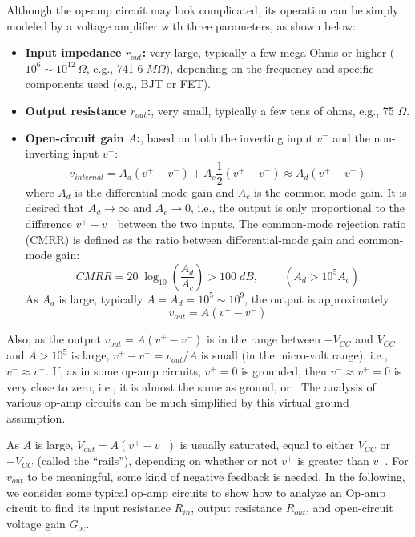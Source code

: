Although the op-amp circuit may look complicated, its operation can be simply 
modeled by a voltage amplifier with three parameters, as shown below:


\begin{itemize}
\item
  {\bf Input impedance $r_{out}$:} very large, typically a few mega-Ohms or
  higher ($10^6\sim 10^{12}\,\Omega$, e.g., 741 $6\;M\Omega$), depending on 
  the frequency and specific components used (e.g., BJT or FET).

\item {\bf Output resistance $r_{out}$:}, very small, typically a few tens of
  ohms, e.g., 75 $\Omega$.

\item {\bf Open-circuit gain $A$:}, based on both the inverting input $v^-$ 
  and the non-inverting input $v^+$:
  \[
  v_{internal}=A_d (v^+ - v^-)+A_c \frac{1}{2}(v^+ + v^-)\approx A_d (v^+ - v^-) 
  \]
  where $A_d$ is the differential-mode gain and $A_c$ is the common-mode gain.
  It is desired that $A_d\rightarrow \infty$ and $A_c\rightarrow 0$, i.e., the 
  output is only proportional to the difference $v^+-v^-$ between the two inputs. 
  The common-mode rejection ratio (CMRR) is defined as the ratio between 
  differential-mode gain and common-mode gain:
  \[ CMRR=20\;\log_{10} \left(\frac{A_d}{A_c}\right)>100\;dB,
  \;\;\;\;\;\;\;\;(A_d>10^5 A_c) \]
  As $A_d$ is large, typically $A=A_d=10^5 \sim 10^9$, the output is approximately
  \[ v_{out}=A(v^+-v^-) \]
\end{itemize}

Also, as the output $v_{out}=A(v^+-v^-)$ is in the range between $-V_{CC}$ 
and $V_{CC}$ and $A>10^5$ is large, $v^+-v^-=v_{out}/A$ is small (in the 
micro-volt range), i.e., $v^-\approx v^+$. If, as in some op-amp circuits, 
$v^+=0$ is grounded, then $v^-\approx v^+=0$ is very close to zero, i.e., 
it is almost the same as ground, or 
.
The analysis of various op-amp circuits can be much simplified by this virtual
ground assumption.

As $A$ is large, $V_{out}=A(v^+-v^-)$ is usually saturated, equal to either 
$V_{CC}$ or $-V_{CC}$ (called the ``rails''), depending on whether or not 
$v^+$ is greater than $v^-$. For $v_{out}$ to be meaningful, some kind of
negative feedback is needed. In the following, we consider some typical 
op-amp circuits to show how to analyze an Op-amp circuit to find its input 
resistance $R_{in}$, output resistance $R_{out}$, and open-circuit voltage 
gain $G_{oc}$.

